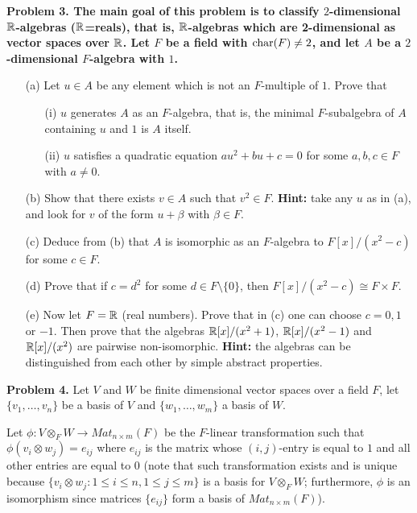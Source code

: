 \documentclass[12pt]{amsart}
\begin{document}
\bf{Problem 3. }\rm The main goal of this problem is to classify
$2$-dimensional ${\mathbb R}$-algebras (${\mathbb R}$=reals), that is,
${\mathbb R}$-algebras which are 2-dimensional as vector spaces over ${\mathbb R}$.
\skv
Let $F$ be a field with ${\rm char}(F)\neq 2$, and
let $A$ be a $2$-dimensional $F$-algebra with $1$.
\begin{itemize}
\item[(a)] Let $u\in A$ be any element which is not an $F$-multiple of $1$.
Prove that
\begin{itemize}
\item[(i)] $u$ generates $A$ as an $F$-algebra, that is, the minimal $F$-subalgebra of $A$ containing $u$ and $1$ is $A$ itself.
\item[(ii)] $u$ satisfies a quadratic equation $au^2+bu+c=0$
for some $a,b,c\in F$ with $a\neq 0$.
\end{itemize}
\item[(b)] Show that there exists $v\in A$ such that $v^2\in F$.
{\bf Hint:} take any $u$ as in (a), and look for $v$ of the form
$u+\beta$ with $\beta\in F$.
\item[(c)] Deduce from (b) that $A$ is isomorphic as an $F$-algebra
to  $F[x]/(x^2-c)$ for some $c\in F$. 
\item[(d)] Prove that if $c=d^2$ for some $d\in F\setminus\{0\}$, then $F[x]/(x^2-c)\cong F\times F$.
\item[(e)] Now let $F={\mathbb R}$ (real numbers). Prove that in (c) one can choose
$c=0,1$ or $-1$. Then prove that the algebras ${\mathbb R}[x]/(x^2+1)$, ${\mathbb R}[x]/(x^2-1)$ and ${\mathbb R}[x]/(x^2)$ 
are pairwise non-isomorphic. {\bf Hint:} the algebras can be distinguished from
each other by simple abstract properties.
\end{itemize}

\skv

{\bf Problem 4. } Let $V$ and $W$ be finite dimensional vector spaces
over a field $F$, let $\{v_1,\ldots, v_n\}$ be a basis of $V$
and $\{w_1,\ldots, w_m\}$ a basis of $W$.

Let  $\phi: V\otimes_F W\to Mat_{n\times m}(F)$ be the
$F$-linear transformation such that $\phi(v_i\otimes w_j)=e_{ij}$
where $e_{ij}$ is the matrix whose $(i,j)$-entry is equal to $1$ and all
other entries are equal to $0$ (note that such transformation
exists and is unique because $\{v_i\otimes w_j : 1\leq i\leq n, 1\leq j\leq m\}$
is a basis for $V\otimes_F W$; furthermore, $\phi$ is an isomorphism
since matrices $\{e_{ij}\}$ form a basis of $Mat_{n\times m}(F)$).
\end{document}
